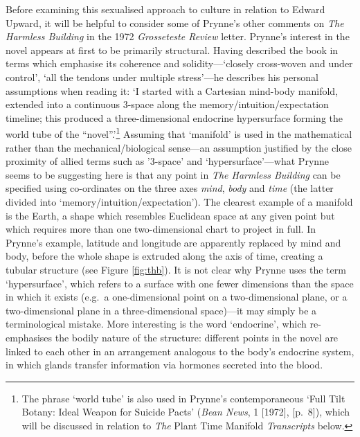 \documentclass[]{article}
\begin{document}
Before examining this sexualised approach to culture in relation to
Edward Upward, it will be helpful to consider some of Prynne's other
comments on \emph{The Harmless Building} in the 1972 \emph{Grosseteste
Review} letter. Prynne's interest in the novel appears at first to be
primarily structural. Having described the book in terms which emphasise
its coherence and solidity---`closely cross-woven and under control',
`all the tendons under multiple stress'---he describes his personal
assumptions when reading it: `I started with a Cartesian mind-body
manifold, extended into a continuous 3-space along the
memory/intuition/expectation timeline; this produced a three-dimensional
endocrine hypersurface forming the world tube of the
``novel''.'\footnote{The phrase `world tube' is also used in Prynne's
  contemporaneous `Full Tilt Botany: Ideal Weapon for Suicide Pacts'
  (\emph{Bean News}, 1 {[}1972{]}, {[}p.~8{]}), which will be discussed
  in relation to \emph{The} Plant Time Manifold \emph{Transcripts}
  below.} Assuming that `manifold' is used in the mathematical rather
than the mechanical/biological sense---an assumption justified by the
close proximity of allied terms such as '3-space' and
`hypersurface'---what Prynne seems to be suggesting here is that any
point in \emph{The Harmless Building} can be specified using
co-ordinates on the three axes \emph{mind}, \emph{body} and \emph{time}
(the latter divided into `memory/intuition/expectation'). The clearest
example of a manifold is the Earth, a shape which resembles Euclidean
space at any given point but which requires more than one
two-dimensional chart to project in full. In Prynne's example, latitude
and longitude are apparently replaced by mind and body, before the whole
shape is extruded along the axis of time, creating a tubular structure
(see Figure \ref{fig:thb}). It is not clear why Prynne uses the term
`hypersurface', which refers to a surface with one fewer dimensions than
the space in which it exists (e.g.~a one-dimensional point on a
two-dimensional plane, or a two-dimensional plane in a three-dimensional
space)---it may simply be a terminological mistake. More interesting is
the word `endocrine', which re-emphasises the bodily nature of the
structure: different points in the novel are linked to each other in an
arrangement analogous to the body's endocrine system, in which glands
transfer information via hormones secreted into the blood.
\end{document}
